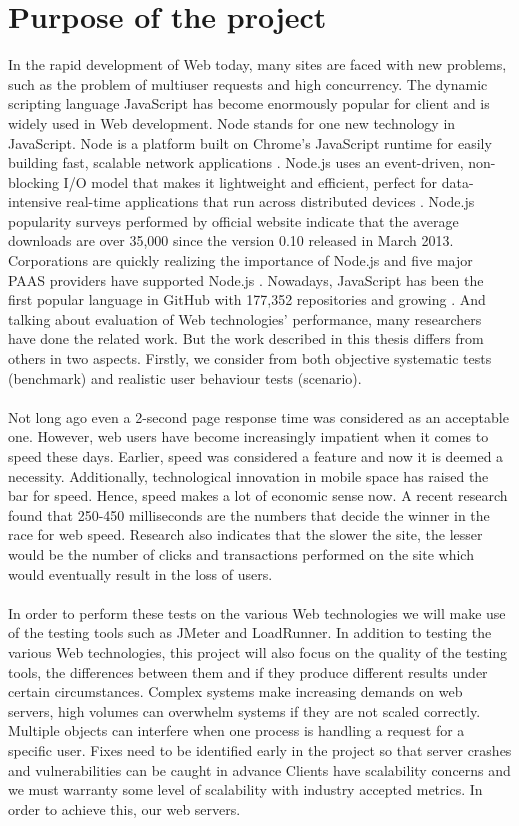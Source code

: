 \documentclass[../thesis.tex]{subfiles}
\begin{document}
\section{Purpose of the project}
In the rapid development of Web today, many sites are faced with new problems, such as the problem of multiuser requests and high concurrency. The dynamic scripting language JavaScript has become enormously popular for client and is widely used in Web development. Node stands for one new technology in JavaScript. Node is a platform built on Chrome's JavaScript runtime for easily building fast, scalable network applications \cite{server}. Node.js uses an event-driven, non- blocking I/O model that makes it lightweight and efficient, perfect for data-intensive real-time applications that run across distributed devices \cite{server}. Node.js popularity surveys performed by official website indicate that the average downloads are over 35,000 since the version 0.10 released in March 2013. Corporations are quickly realizing the importance of Node.js and five major PAAS providers have supported Node.js \cite{node}. Nowadays, JavaScript has been the first popular language in GitHub with 177,352 repositories and growing \cite{github-js}. And talking about evaluation of Web technologies' performance, many researchers have done the related work. But the work described in this thesis differs from others in two aspects. Firstly, we consider from both objective systematic tests (benchmark) and realistic user behaviour tests (scenario).
\paragraph{}
Not long ago even a 2-second page response time was considered as an acceptable one. However, web users have become increasingly impatient when it comes to speed these days. Earlier, speed was considered a feature and now it is deemed a necessity. Additionally, technological innovation in mobile space has raised the bar for speed. Hence, speed makes a lot of economic sense now. A recent research found that 250-450 milliseconds are the numbers that decide the winner in the race for web speed. Research also indicates that the slower the site, the lesser would be the number of clicks and transactions performed on the site which would eventually result in the loss of users.
\paragraph{}
In order to perform these tests on the various Web technologies we will make use of the testing tools such as JMeter and LoadRunner. In addition to testing the various Web technologies, this project will also focus on the quality of the testing tools, the differences between them and if they produce different results under certain circumstances. Complex systems make increasing demands on web servers, high volumes can overwhelm systems if they are not scaled correctly. Multiple objects can interfere when one process is handling a request for a specific user. Fixes need to be identified early in the project so that server crashes and vulnerabilities can be caught in advance Clients have scalability concerns and we must warranty some level of scalability with industry accepted metrics. In order to achieve this, our web servers.
\end{document}
